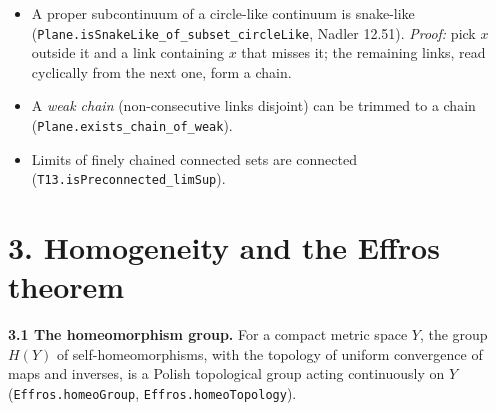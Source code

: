 \documentclass[11pt]{article}
\newcommand{\lean}[1]{\texttt{#1}}
\begin{document}
\begin{itemize}
  \item A proper subcontinuum of a circle-like continuum is snake-like (\lean{Plane.\hspace{0pt}isSnakeLike\_\hspace{0pt}of\_\hspace{0pt}subset\_\hspace{0pt}circleLike}, Nadler 12.51). \emph{Proof:} pick $x$ outside it and a link containing $x$ that misses it; the remaining links, read cyclically from the next one, form a chain.
  \item A \emph{weak chain} (non-consecutive links disjoint) can be trimmed to a chain (\lean{Plane.\hspace{0pt}exists\_\hspace{0pt}chain\_\hspace{0pt}of\_\hspace{0pt}weak}).
  \item Limits of finely chained connected sets are connected (\lean{T13.\hspace{0pt}isPreconnected\_\hspace{0pt}limSup}).
\end{itemize}

\section*{3. Homogeneity and the Effros theorem}

\textbf{3.1 The homeomorphism group.} For a compact metric space $Y$, the group $H(Y)$ of self-homeomorphisms, with the topology of uniform convergence of maps and inverses, is a Polish topological group acting continuously on $Y$ (\lean{Effros.\hspace{0pt}homeoGroup}, \lean{Effros.\hspace{0pt}homeoTopology}).
\end{document}

